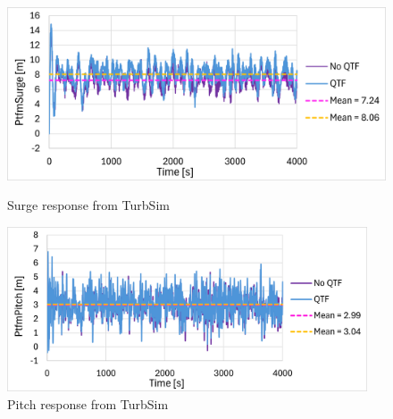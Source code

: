 \documentclass[a4paper, 11pt]{article}
\begin{document}
\begin{figure}[H]
    \begin{minipage}{0.48\textwidth}
        \centering
        \includegraphics[width=1\textwidth]{3.2_turb_surge.png}
        \caption{\small Surge response from TurbSim}
        \label{fig:3.2_turb_surge}
    \end{minipage}
    \hfill
    \begin{minipage}{0.5\textwidth}
        \centering
        \includegraphics[width=0.95\textwidth]{3.2_turb_pitch.png}
        \caption{\small Pitch response from TurbSim}
        \label{fig:3.2_turb_pitch}
    \end{minipage}
\end{figure}
\end{document}
